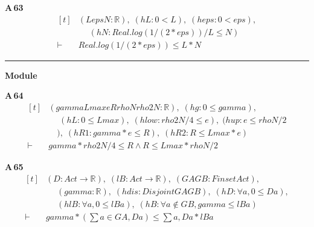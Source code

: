 \noindent\textbf{A\,63}\quad{}
{\footnotesize\[ \begin{aligned}[t]
&(\mathit{L} \mathit{eps} \mathit{N} : \mathbb{R} ),\; (\mathit{hL} : 0 < \mathit{L}),\; (\mathit{heps} : 0 < \mathit{eps}),\\
&\quad \; (\mathit{hN} : \mathit{Real}.\mathit{log} (1/(2*\mathit{eps}))/\mathit{L} \leq \mathit{N})\\
\vdash\;&\mathit{Real}.\mathit{log} (1/(2*\mathit{eps})) \leq \mathit{L}*\mathit{N}
\end{aligned} \]}

\vspace{4pt}\noindent\rule{\columnwidth}{0.4pt}\par\vspace{2pt}
\noindent\textbf{Module }\par\vspace{3pt}

\noindent\textbf{A\,64}\quad{}
{\footnotesize\[ \begin{aligned}[t]
&(\mathit{gamma} \mathit{Lmax} \mathit{e} \mathit{R} \mathit{rhoN} \mathit{rho2N} : \mathbb{R} ),\; (\mathit{hg} : 0 \leq \mathit{gamma}),\\
&\quad \; (\mathit{hL} : 0 \leq \mathit{Lmax}),\; (\mathit{hlow} : \mathit{rho2N} / 4 \leq \mathit{e}),\; (\mathit{hup} : \mathit{e} \leq \mathit{rhoN} / 2\\
&\quad ),\; (\mathit{hR1} : \mathit{gamma} * \mathit{e} \leq \mathit{R}),\; (\mathit{hR2} : \mathit{R} \leq \mathit{Lmax} * \mathit{e})\\
\vdash\;&\mathit{gamma} * \mathit{rho2N} / 4 \leq \mathit{R} \wedge \mathit{R} \leq \mathit{Lmax} * \mathit{rhoN} / 2
\end{aligned} \]}

\noindent\textbf{A\,65}\quad{}
{\footnotesize\[ \begin{aligned}[t]
&(\mathit{D} : \mathit{Act} \to \mathbb{R} ),\; (\mathit{lB} : \mathit{Act} \to \mathbb{R} ),\; (\mathit{GA} \mathit{GB} : \mathit{Finset} \mathit{Act}),\\
&\quad \; (\mathit{gamma} : \mathbb{R} ),\; (\mathit{hdis} : \mathit{Disjoint} \mathit{GA} \mathit{GB}),\; (\mathit{hD} : \forall \mathit{a}, 0 \leq \mathit{D} \mathit{a}),\\
&\quad \; (\mathit{hlB} : \forall \mathit{a}, 0 \leq \mathit{lB} \mathit{a}),\; (\mathit{hB} : \forall \mathit{a} \notin \mathit{GB}, \mathit{gamma} \leq \mathit{lB} \mathit{a})\\
\vdash\;&\mathit{gamma} * (\textstyle\sum \mathit{a} \in \mathit{GA}, \mathit{D} \mathit{a}) \leq \textstyle\sum \mathit{a}, \mathit{D} \mathit{a} * \mathit{lB} \mathit{a}
\end{aligned} \]}

